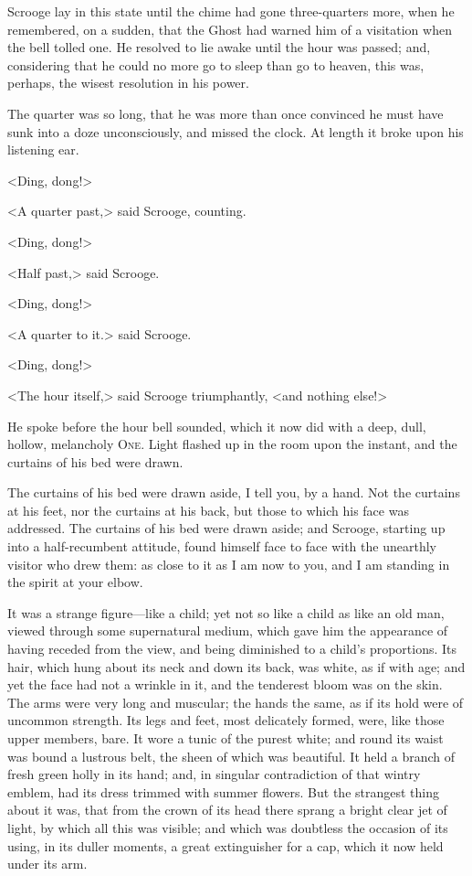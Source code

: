 Scrooge lay in this state until the chime had gone three-quarters more, when he remembered, on a sudden, that the Ghost had warned him of a visitation when the bell tolled one. He resolved to lie awake until the hour was passed; and, considering that he could no more go to sleep than go to heaven, this was, perhaps, the wisest resolution in his power.

The quarter was so long, that he was more than once convinced he must have sunk into a doze unconsciously, and missed the clock. At length it broke upon his listening ear.

<Ding, dong!>

<A quarter past,> said Scrooge, counting.

<Ding, dong!>

<Half past,> said Scrooge.

<Ding, dong!>

<A quarter to it.> said Scrooge.

<Ding, dong!>

<The hour itself,> said Scrooge triumphantly, <and nothing else!>

He spoke before the hour bell sounded, which it now did with a deep, dull, hollow, melancholy \textsc{One}. Light flashed up in the room upon the instant, and the curtains of his bed were drawn.

The curtains of his bed were drawn aside, I tell you, by a hand. Not the curtains at his feet, nor the curtains at his back, but those to which his face was addressed. The curtains of his bed were drawn aside; and Scrooge, starting up into a half-recumbent attitude, found himself face to face with the unearthly visitor who drew them: as close to it as I am now to you, and I am standing in the spirit at your elbow.

It was a strange figure—like a child; yet not so like a child as like an old man, viewed through some supernatural medium, which gave him the appearance of having receded from the view, and being diminished to a child's proportions. Its hair, which hung about its neck and down its back, was white, as if with age; and yet the face had not a wrinkle in it, and the tenderest bloom was on the skin. The arms were very long and muscular; the hands the same, as if its hold were of uncommon strength. Its legs and feet, most delicately formed, were, like those upper members, bare. It wore a tunic of the purest white; and round its waist was bound a lustrous belt, the sheen of which was beautiful. It held a branch of fresh green holly in its hand; and, in singular contradiction of that wintry emblem, had its dress trimmed with summer flowers. But the strangest thing about it was, that from the crown of its head there sprang a bright clear jet of light, by which all this was visible; and which was doubtless the occasion of its using, in its duller moments, a great extinguisher for a cap, which it now held under its arm.

